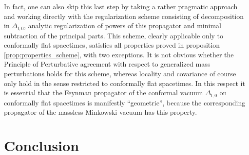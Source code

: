 \documentclass[11pt]{book}
\newcommand{\fsf}{\mathsf{f}}
\theoremstyle{break}
\begin{document}
In fact, one can also skip this last step by taking a rather pragmatic approach and working directly with the regularization scheme consisting of decomposition in $\Delta_{\fsf,0}$, analytic regularization of powers of this propagator and minimal subtraction of the principal parts. This scheme, clearly applicable only to conformally flat spacetimes, satisfies all properties proved in proposition \ref{prop:properties_scheme}, with two exceptions. It is not obvious whether the Principle of Perturbative agreement with respect to generalized mass perturbations holds for this scheme, whereas locality and covariance of course only hold in the sense restricted to conformally flat spacetimes. In this respect it is essential that the Feynman propagator of the conformal vacuum $\Delta_{\fsf,0}$ on conformally flat spacetimes is manifestly ``geometric'', because the corresponding propagator of the massless Minkowski vacuum has this property.


\chapter*{Conclusion}
\end{document}
